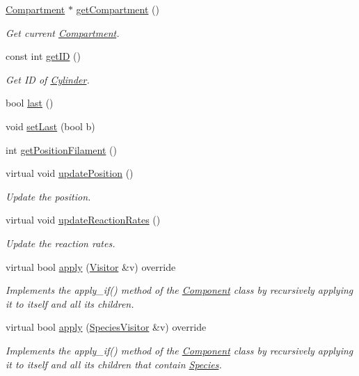 \begin{DoxyCompactItemize}
\hyperlink{classCompartment}{Compartment} $\ast$ \hyperlink{classCylinder_a09201650224a4612db179266b2ff43b7}{get\+Compartment} ()
\begin{DoxyCompactList}\small\item\em Get current \hyperlink{classCompartment}{Compartment}. \end{DoxyCompactList}\item 
const int \hyperlink{classCylinder_aa571913545eb8c2ccde4cee86fe4af4d}{get\+I\+D} ()
\begin{DoxyCompactList}\small\item\em Get I\+D of \hyperlink{classCylinder}{Cylinder}. \end{DoxyCompactList}\item 
bool \hyperlink{classCylinder_a2dd850edf22c137ecd734ee490741c37}{last} ()
\item 
void \hyperlink{classCylinder_a41b9f84107abb9603038ede14fc33073}{set\+Last} (bool b)
\item 
int \hyperlink{classCylinder_a2516138846ce5fcc29b2a7379e6beae7}{get\+Position\+Filament} ()
\item 
virtual void \hyperlink{classCylinder_aff701d6f4400ab216431d627c54a0b4e}{update\+Position} ()
\begin{DoxyCompactList}\small\item\em Update the position. \end{DoxyCompactList}\item 
virtual void \hyperlink{classCylinder_a1e824345ba2ec690930b34f74cc3badf}{update\+Reaction\+Rates} ()
\begin{DoxyCompactList}\small\item\em Update the reaction rates. \end{DoxyCompactList}\item 
virtual bool \hyperlink{classComposite_a58123ab346f6621a187bebe456e383ea}{apply} (\hyperlink{classVisitor}{Visitor} \&v) override
\begin{DoxyCompactList}\small\item\em Implements the apply\+\_\+if() method of the \hyperlink{classComponent}{Component} class by recursively applying it to itself and all its children. \end{DoxyCompactList}\item 
virtual bool \hyperlink{classComposite_a18937a1f6f84a159e77ba83dd34b2e20}{apply} (\hyperlink{classSpeciesVisitor}{Species\+Visitor} \&v) override
\begin{DoxyCompactList}\small\item\em Implements the apply\+\_\+if() method of the \hyperlink{classComponent}{Component} class by recursively applying it to itself and all its children that contain \hyperlink{classSpecies}{Species}. \end{DoxyCompactList}\item 

\end{DoxyCompactItemize}
